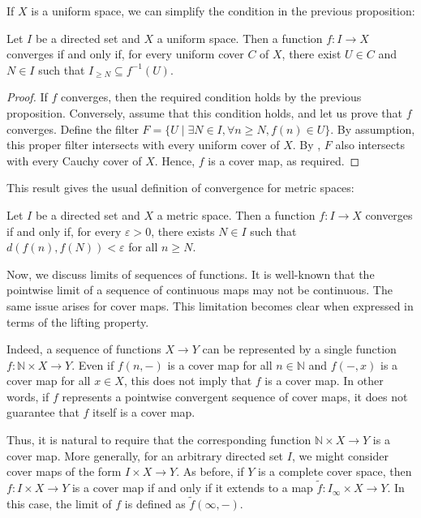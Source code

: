\documentclass[pdflatex,sn-mathphys-num]{sn-jnl}
\theoremstyle{definition}
\theoremstyle{remark}
\numberwithin{figure}{section}
\begin{document}
If $X$ is a uniform space, we can simplify the condition in the previous proposition:

\begin{prop}
Let $I$ be a directed set and $X$ a uniform space.
Then a function $f : I \to X$ converges if and only if, for every uniform cover $C$ of $X$, there exist $U \in C$ and $N \in I$ such that $I_{\geq N} \subseteq f^{-1}(U)$.
\end{prop}
\begin{proof}
If $f$ converges, then the required condition holds by the previous proposition.
Conversely, assume that this condition holds, and let us prove that $f$ converges.
Define the filter $F = \{ U \mid \exists N \in I, \forall n \geq N, f(n) \in U \}$.
By assumption, this proper filter intersects with every uniform cover of $X$.
By , $F$ also intersects with every Cauchy cover of $X$.
Hence, $f$ is a cover map, as required.
\end{proof}

This result gives the usual definition of convergence for metric spaces:

\begin{cor}
Let $I$ be a directed set and $X$ a metric space.
Then a function $f : I \to X$ converges if and only if, for every $\varepsilon > 0$, there exists $N \in I$ such that $d(f(n),f(N)) < \varepsilon$ for all $n \geq N$.
\end{cor}

Now, we discuss limits of sequences of functions.
It is well-known that the pointwise limit of a sequence of continuous maps may not be continuous.
The same issue arises for cover maps.
This limitation becomes clear when expressed in terms of the lifting property.

Indeed, a sequence of functions $X \to Y$ can be represented by a single function $f : \mathbb{N} \times X \to Y$.
Even if $f(n,-)$ is a cover map for all $n \in \mathbb{N}$ and $f(-,x)$ is a cover map for all $x \in X$, this does not imply that $f$ is a cover map.
In other words, if $f$ represents a pointwise convergent sequence of cover maps, it does not guarantee that $f$ itself is a cover map.

Thus, it is natural to require that the corresponding function $\mathbb{N} \times X \to Y$ is a cover map.
More generally, for an arbitrary directed set $I$, we might consider cover maps of the form $I \times X \to Y$. 
As before, if $Y$ is a complete cover space, then $f : I \times X \to Y$ is a cover map if and only if it extends to a map $\widetilde{f} : I_\infty \times X \to Y$.
In this case, the limit of $f$ is defined as $\widetilde{f}(\infty, -)$.
\end{document}
